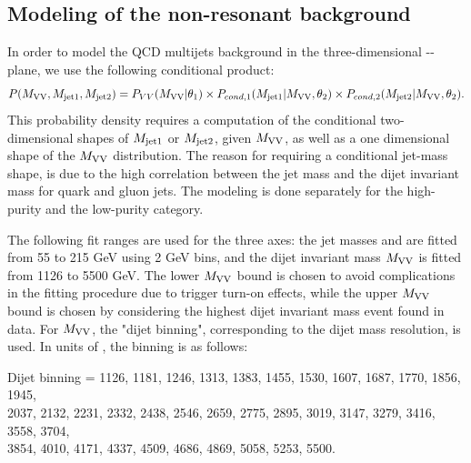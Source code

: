 \subsection{Modeling of the non-resonant background}
\label{sec:nonresbkgd}

In order to model the QCD multijets background in the three-dimensional \MVV-\MJO-\MJT plane, we use the following conditional product:
\begin{equation}
	\footnotesize
	P(M_{\rm VV},M_{\rm jet1},M_{\rm jet2}) = P_{VV}(M_{\rm VV}|\theta_1) \times P_{cond,1}(M_{\rm jet1}|M_{\rm VV},\theta_2) \times P_{cond,2}(M_{\rm jet2}|M_{\rm VV},\theta_2).
\end{equation} 
This probability density requires a computation of the conditional two-dimensional shapes of $M_{\rm jet1}$ or $M_{\rm jet2}$, given $M_{\rm VV}$, as well as a one dimensional shape of the $M_{\rm VV}$ distribution. The reason for requiring a conditional jet-mass shape, is due to the high correlation between the jet mass and the dijet invariant mass for quark and gluon jets. The modeling is done separately for the high-purity and the low-purity category.\par
The following fit ranges are used for the three axes: the jet masses \MJO and \MJT are fitted from 55 to 215 GeV using 2 GeV bins, and the dijet invariant mass $M_{\rm VV}$ is fitted from 1126 to 5500 GeV. The lower $M_{\rm VV}$ bound is chosen to avoid complications in the fitting procedure due to trigger turn-on effects, while the upper $M_{\rm VV}$ bound is chosen by considering the highest dijet invariant mass event found in data. For $M_{\rm VV}$, the "dijet binning", corresponding to the dijet mass resolution, is used. In units of \GeV, the binning is as follows:\newline


\noindent Dijet binning = 1126, 1181, 1246, 1313, 1383, 1455, 1530, 1607, 1687, 1770, 1856, 1945, \\
2037, 2132, 2231, 2332, 2438, 2546, 2659, 2775, 2895, 3019, 3147, 3279, 3416, 3558, 3704, \\
3854, 4010, 4171, 4337, 4509, 4686, 4869, 5058, 5253, 5500.\newline


